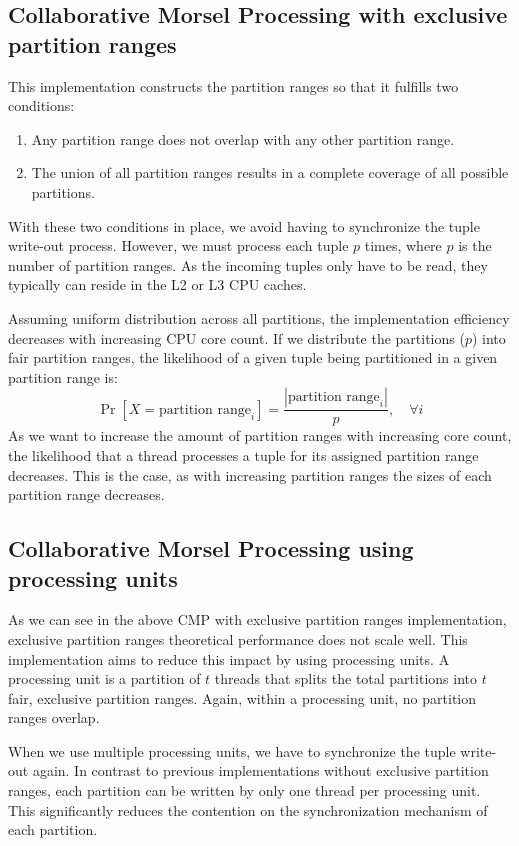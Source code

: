 \subsection{Collaborative Morsel Processing with exclusive partition ranges}\label{section-CMP-with_exclusive-partition-ranges}
This implementation constructs the partition ranges so that it fulfills two conditions:
\begin{enumerate}
  \item Any partition range does not overlap with any other partition range.
  \item The union of all partition ranges results in a complete coverage of all possible partitions.
\end{enumerate}
With these two conditions in place, we avoid having to synchronize the tuple write-out process.
However, we must process each tuple $p$ times, where $p$ is the number of partition ranges.
As the incoming tuples only have to be read, they typically can reside in the L2 or L3 \ac{CPU} caches.

Assuming uniform distribution across all partitions, the implementation efficiency decreases with increasing CPU core count.
If we distribute the partitions ($p$) into fair partition ranges, the likelihood of a given tuple being partitioned in a given partition range is:
\begin{equation}\label{equation-CMP-exclusive-partition-ranges}
  \Pr[X=\textrm{partition range}_i] = \frac{|\textrm{partition range}_i|}{p},  \quad \forall i
\end{equation}
As we want to increase the amount of partition ranges with increasing core count, the likelihood that a thread processes a tuple for its assigned partition range decreases.
This is the case, as with increasing partition ranges the sizes of each partition range decreases.
\subsection{Collaborative Morsel Processing using processing units}
As we can see in the above \ac{CMP} with exclusive partition ranges implementation, exclusive partition ranges theoretical performance does not scale well.
This implementation aims to reduce this impact by using processing units.
A processing unit is a partition of $t$ threads that splits the total partitions into $t$ fair, exclusive partition ranges.
Again, within a processing unit, no partition ranges overlap.

When we use multiple processing units, we have to synchronize the tuple write-out again.
In contrast to previous implementations without exclusive partition ranges, each partition can be written by only one thread per processing unit.
This significantly reduces the contention on the synchronization mechanism of each partition.


